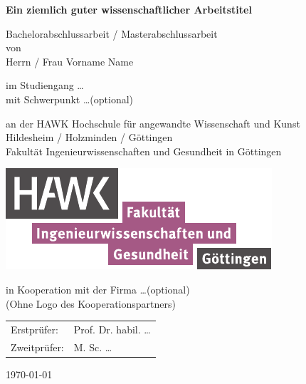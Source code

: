

\begin{titlepage}
	\begin{center}
		{\Large \textbf{Ein ziemlich guter wissenschaftlicher Arbeitstitel}}
		
		\vspace{\fill}
		
		Bachelorabschlussarbeit / Masterabschlussarbeit \\
		von \\
		Herrn / Frau Vorname Name
		
		\vspace{0.9cm}
		
		im Studiengang \dots \\
		mit Schwerpunkt \dots (optional)\\
		
		\vspace{0.9cm}
		
		an der HAWK Hochschule für angewandte Wissenschaft und Kunst\\
		Hildesheim / Holzminden / Göttingen\\
		Fakultät Ingenieurwissenschaften und Gesundheit in Göttingen
		
		\vspace{0.1cm}
		
		\includegraphics[height=3.cm]{pic/hawk-fi-logo}
		
		\vspace{0.1cm}
		
		in Kooperation mit der Firma \dots (optional)\\
		(Ohne Logo des Kooperationspartners)
		
		\vspace{2.0cm}
		
		\begin{tabular}{p{3cm}l}
			Erstprüfer: & Prof. Dr. habil. \dots \\ 
			Zweitprüfer: & M. Sc. \dots \\  
		\end{tabular} 
		
		\vspace{1.6cm}
	
		\today
		
	\end{center}
	
	
	
\end{titlepage}